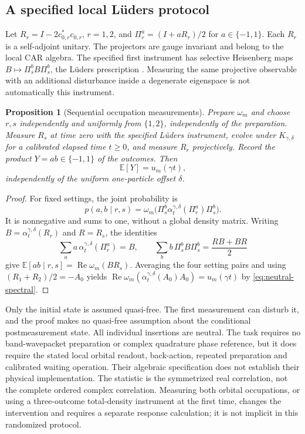 \documentclass[11pt]{article}
\newtheorem{proposition}[theorem]{Proposition}
\theoremstyle{definition}
\begin{document}
\subsection{A specified local L\"uders protocol}

Let $R_r=I-2c_{0,r}^*c_{0,r}$, $r=1,2$, and
$\Pi_r^a=(I+aR_r)/2$ for $a\in\{-1,1\}$. Each $R_r$ is a self-adjoint
unitary. The projectors are gauge invariant and belong to the local CAR
algebra. The specified first instrument has selective Heisenberg maps
$B\mapsto\Pi_s^b B\Pi_s^b$, the L\"uders prescription
\cite[Section 2, equations (7)--(8)]{Luders2006}. Measuring the same
projective observable with an additional disturbance inside a degenerate
eigenspace is not automatically this instrument.

\begin{proposition}[Sequential occupation measurements]
\label{prop:neutral-luders}
Prepare $\omega_m$ and choose $r,s$ independently and uniformly from
$\{1,2\}$, independently of the preparation. Measure $R_s$ at time zero
with the specified L\"uders instrument, evolve under $K_{\gamma,\delta}$
for a calibrated elapsed time $t\ge0$, and measure $R_r$ projectively.
Record the product $Y=ab\in\{-1,1\}$ of the outcomes. Then
\begin{equation}
 \mathbb E[Y]=u_m(\gamma t),
 \label{eq:neutral-luders}
\end{equation}
independently of the uniform one-particle offset $\delta$.
\end{proposition}
\begin{proof}
For fixed settings, the joint probability is
\[
 p(a,b\mid r,s)
   =\omega_m\bigl(\Pi_s^b\alpha_t^{\gamma,\delta}(\Pi_r^a)\Pi_s^b\bigr).
\]
It is nonnegative and sums to one, without a global density matrix.
Writing $B=\alpha_t^{\gamma,\delta}(R_r)$ and $R=R_s$, the identities
\[
 \sum_a a\,\alpha_t^{\gamma,\delta}(\Pi_r^a)=B,
 \qquad
 \sum_b b\,\Pi_s^b B\Pi_s^b=\frac{RB+BR}{2}
\]
give
$\mathbb E[ab\mid r,s]=\operatorname{Re}\omega_m(BR_s)$.
Averaging the four setting pairs and using
$(R_1+R_2)/2=-A_0$ yields
$\operatorname{Re}\omega_m(\alpha_t^{\gamma,\delta}(A_0)A_0)
=u_m(\gamma t)$ by \eqref{eq:neutral-spectral}.
\end{proof}

Only the initial state is assumed quasi-free. The first measurement can
disturb it, and the proof makes no quasi-free assumption about the conditional
postmeasurement state. All individual insertions are neutral. The task
requires no band-wavepacket preparation or complex quadrature phase reference,
but it does require the stated local orbital readout, back-action, repeated
preparation and calibrated waiting operation. Their algebraic specification
does not establish their physical implementation. The statistic is the
symmetrized real correlation, not the complete ordered complex correlation.
Measuring both orbital occupations, or using a three-outcome total-density
instrument at the first time, changes the intervention and requires a
separate response calculation; it is not implicit in this randomized protocol.
\end{document}
